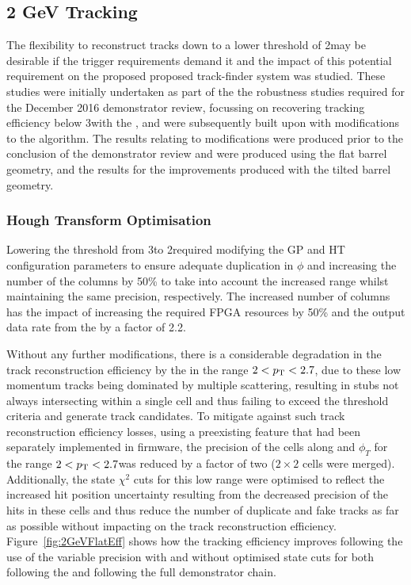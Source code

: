 \subsection{2 GeV Tracking}\label{subsec:Tmtt2GeV}
The flexibility to reconstruct tracks down to a lower \pT threshold of 2\GeV may be desirable if the trigger requirements demand it and the impact of this potential requirement on the proposed proposed track-finder system was studied.
These studies were initially undertaken as part of the the robustness studies required for the December 2016 demonstrator review, focussing on recovering tracking efficiency below 3\GeV with the \HT, and were subsequently built upon with modifications to the \KF algorithm. 
The results relating to \HT modifications were produced prior to the conclusion of the demonstrator review and were produced using the flat barrel geometry, and the results for the \KF improvements produced with the tilted barrel geometry.

\subsubsection{Hough Transform Optimisation}\label{subsubsec:lowPtOptHT}
Lowering the \HT \pT threshold from 3\GeV to 2\GeV required modifying the GP and HT configuration parameters to ensure adequate duplication in $\phi$ and increasing the number of the \qpt columns by 50\% to take into account the increased \pt range whilst maintaining the same precision, respectively.
The increased number of \qpt columns has the impact of increasing the required FPGA resources by 50\% and the output data rate from the \HT by a factor of 2.2.

Without any further modifications, there is a considerable degradation in the track reconstruction efficiency by the \HT in the range $2 < p_{\mathrm{T}} < 2.7$\GeVc, due to these low momentum tracks being dominated by multiple scattering, resulting in stubs not always intersecting within a single \HT cell and thus failing to exceed the threshold criteria and generate track candidates.
To mitigate against such track reconstruction efficiency losses, using a preexisting feature that had been separately implemented in firmware, the precision of the \HT cells along \qpt and $\phi_{T}$ for the range $2 < p_{\mathrm{T}} < 2.7$\GeVc was reduced by a factor of two (\ie $2 \times 2$ cells were merged).
Additionally, the \KF state $\chi^2$ cuts for this low \pT range were optimised to reflect the increased hit position uncertainty resulting from the decreased precision of the hits in these \HT cells and thus reduce the number of duplicate and fake tracks as far as possible without impacting on the \HT track reconstruction efficiency.
Figure~\ref{fig:2GeVFlatEff} shows how the tracking efficiency improves following the use of the variable precision \HT with and without optimised \KF state cuts for both following the \HT and following the full demonstrator chain. 

